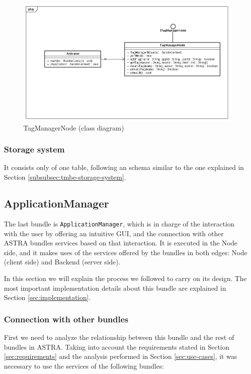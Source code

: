 \begin{figure}[h!]
 \begin{center}
 \includegraphics[scale=0.4]{diagrams/TagManagerNodeClassDiagram.png}
  \caption{\label{img:tmn-cd}TagManagerNode (class diagram)}
 \end{center}
\end{figure}

\subsubsection{Storage system}
It consists only of one table, following an schema similar to the one
explained in Section \ref{subsubsec:tmbe-storage-system}.


\subsection{ApplicationManager}
\label{subsec:am-design}

The last bundle is \verb|ApplicationManager|, which is in charge of the
interaction with the user by offering an intuitive GUI, and the connection with
other ASTRA bundles services based on that interaction. It is executed in the
Node side, and it makes uses of the services offered by the bundles in both
edges: Node (client side) and Backend (server side).
\newline

In this section we will explain the process we followed to carry on its design.
The most important implementation details about this bundle are explained
in Section \ref{sec:implementation}.

\subsubsection{Connection with other bundles}
\label{subsubsec:connections-am}
First we need to analyze the relationship between this bundle and
the rest of bundles in ASTRA.
Taking into account the requirements stated in Section \ref{sec:requirements}
and the analysis performed in Section \ref{sec:use-cases}, it was necessary to
use the services of the following bundles:

